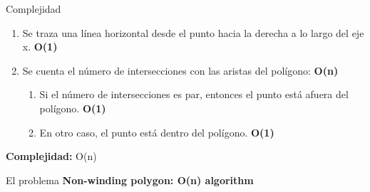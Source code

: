 \documentclass[aspectratio=169,xcolor=dvipsnames, t]{beamer}
\begin{document}
\begin{frame}[c]{Complejidad}
  \begin{enumerate}
  \item Se traza una línea horizontal desde el punto hacia la derecha a lo largo del eje x. \textbf{O(1)}
  \item Se cuenta el número de intersecciones con las aristas del polígono:  \textbf{O(n)}
    \begin{enumerate}
    \item Si el número de intersecciones es par, entonces el punto está afuera del polígono.  \textbf{O(1)}
    \item En otro caso, el punto está dentro del polígono.  \textbf{O(1)}
    \end{enumerate}
  \end{enumerate}
  \textbf{Complejidad:} O(n)
\end{frame}


\begin{frame}{El problema}
  \textbf{Non-winding polygon: O(n) algorithm}\\
  \vspace{0.5cm}
\end{frame}

\end{document}
